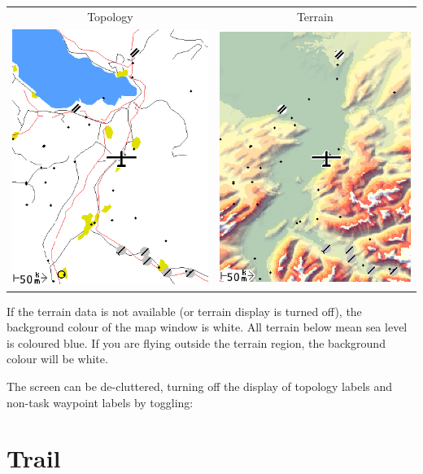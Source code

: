 \begin{center}
\begin{tabular}{c c}
Topology & Terrain \\
\includegraphics[angle=0,width=0.4\linewidth,keepaspectratio='true']{figures/cut-topo.png} &
\includegraphics[angle=0,width=0.4\linewidth,keepaspectratio='true']{figures/cut-terrain.png} \\
\end{tabular}

\end{center}

If the terrain data is not available (or terrain display is turned
off), the background colour of the map window is white.  All terrain
below mean sea level is coloured blue.  If you are flying outside the
terrain region, the background colour will be white.

The screen can be de-cluttered, turning off the display of topology
labels and non-task waypoint labels by toggling:
\begin{quote}
\blink{}\blink{}
\end{quote}


\section{Trail}\label{sec:trail}

